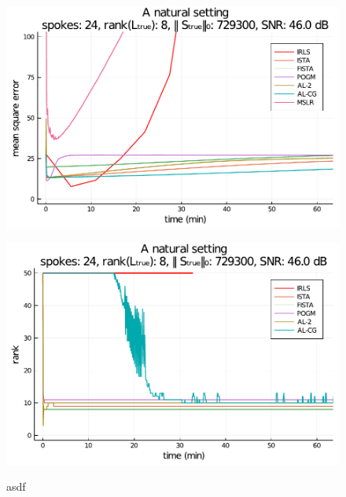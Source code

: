 \begin{figure}
    \centering
    \begin{minipage}{0.48\linewidth}
        \centering
        \includegraphics[width=\linewidth]{images/orig_MSE.pdf}
        \label{fig:orig_MSE}
    \end{minipage}
    \begin{minipage}{0.48\linewidth}
        \centering
        \includegraphics[width=\linewidth]{images/orig_rank.pdf}
        \label{fig:orig_rank}
    \end{minipage}
    \caption{asdf}
    \label{fig:orig}
\end{figure}

